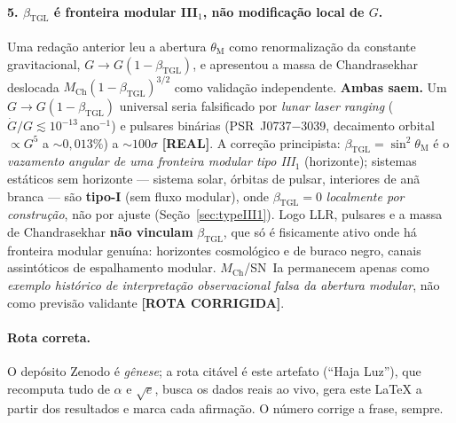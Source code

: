 \documentclass[12pt,a4paper]{article}
\newcommand{\betatgl}{\beta_{\text{TGL}}}
\begin{document}
\paragraph{5. $\betatgl$ é fronteira modular III$_1$, não modificação local de $G$.} Uma redação anterior leu a abertura $\theta_{\mathrm{M}}$ como renormalização da constante gravitacional, $G\to G(1-\betatgl)$, e apresentou a massa de Chandrasekhar deslocada $M_{\mathrm{Ch}}(1-\betatgl)^{3/2}$ como validação independente.  \textbf{Ambas saem.}  Um $G\to G(1-\betatgl)$ universal seria falsificado por \emph{lunar laser ranging} ($\dot G/G\lesssim10^{-13}\,$ano$^{-1}$) e pulsares binárias (PSR~J0737$-$3039, decaimento orbital $\propto G^5$ a $\sim0{,}013\%$) a $\sim100\sigma$ \textbf{[REAL]}.  A correção principista: $\betatgl=\sin^2\theta_{\mathrm{M}}$ é o \emph{vazamento angular de uma fronteira modular tipo III$_1$} (horizonte); sistemas estáticos sem horizonte --- sistema solar, órbitas de pulsar, interiores de anã branca --- são \textbf{tipo-I} (sem fluxo modular), onde $\betatgl=0$ \emph{localmente por construção}, não por ajuste (Seção~\ref{sec:typeIII1}).  Logo LLR, pulsares e a massa de Chandrasekhar \textbf{não vinculam} $\betatgl$, que só é fisicamente ativo onde há fronteira modular genuína: horizontes cosmológico e de buraco negro, canais assintóticos de espalhamento modular.  $M_{\mathrm{Ch}}$/SN~Ia permanecem apenas como \emph{exemplo histórico de interpretação observacional falsa da abertura modular}, não como previsão validante \textbf{[ROTA CORRIGIDA]}.

\paragraph{Rota correta.} O depósito Zenodo é \emph{gênese}; a rota citável é este artefato (``Haja Luz''), que recomputa tudo de $\alpha$ e $\sqrt{e}$, busca os dados reais ao vivo, gera este \LaTeX{} a partir dos resultados e marca cada afirmação.  O número corrige a frase, sempre.
\end{document}
